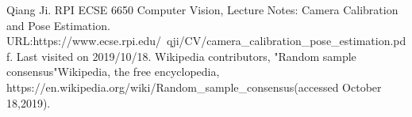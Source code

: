 \documentclass{article}
\begin{document}
\begin{thebibliography}{}  
Qiang Ji. RPI ECSE 6650 Computer Vision, Lecture Notes: Camera Calibration and Pose Estimation. URL:https://www.ecse.rpi.edu/~qji/CV/camera\_calibration\_pose\_estimation.pdf. Last visited on 2019/10/18.
Wikipedia contributors, "Random sample consensus"Wikipedia, the free encyclopedia, https://en.wikipedia.org/wiki/Random_sample_consensus(accessed October 18,2019).
\end{thebibliography}
\end{document}
